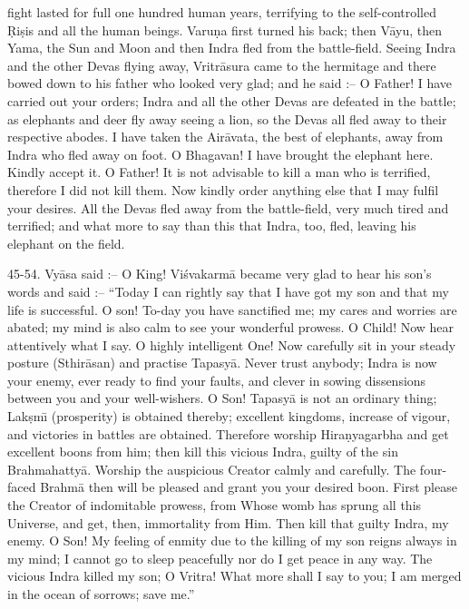 fight lasted for full one hundred human years, terrifying to the self-controlled \d{R}i\d{s}is and all the human beings. Varu\d{n}a first turned his back; then V\=ayu, then Yama, the Sun and Moon and then Indra fled from the battle-field. Seeing Indra and the other Devas flying away, Vritr\=asura came to the hermitage and there bowed down to his father who looked very glad; and he said :-- O Father! I have carried out your orders; Indra and all the other Devas are defeated in the battle; as elephants and deer fly away seeing a lion, so the Devas all fled away to their respective abodes. I have taken the Air\=avata, the best of elephants, away from Indra who fled away on foot. O Bhagavan! I have brought the elephant here. Kindly accept it. O Father! It is not advisable to kill a man who is terrified, therefore I did not kill them. Now kindly order anything else that I may fulfil your desires. All the Devas fled away from the battle-field, very much tired and terrified; and what more to say than this that Indra, too, fled, leaving his elephant on the field.

45-54. Vy\=asa said :-- O King! Vi\'svakarm\=a became very glad to hear his son's words and said :-- ``Today I can rightly say that I have got my son and that my life is successful. O son! To-day you have sanctified me; my cares and worries are abated; my mind is also calm to see your wonderful prowess. O Child! Now hear attentively what I say. O highly intelligent One! Now carefully sit in your steady posture (Sthir\=asan) and practise Tapasy\=a. Never trust anybody; Indra is now your enemy, ever ready to find your faults, and clever in sowing dissensions between you and your well-wishers. O Son! Tapasy\=a is not an ordinary thing; Lak\d{s}m\={\i} (prosperity) is obtained thereby; excellent kingdoms, increase of vigour, and victories in battles are obtained. Therefore worship Hira\d{n}yagarbha and get excellent boons from him; then kill this vicious Indra, guilty of the sin Brahmahatty\=a. Worship the auspicious Creator calmly and carefully. The four-faced Brahm\=a then will be pleased and grant you your desired boon. First please the Creator of indomitable prowess, from Whose womb has sprung all this Universe, and get, then, immortality from Him. Then kill that guilty Indra, my enemy. O Son! My feeling of enmity due to the killing of my son reigns always in my mind; I cannot go to sleep peacefully nor do I get peace in any way. The vicious Indra killed my son; O Vritra! What more shall I say to you; I am merged in the ocean of sorrows; save me.''

